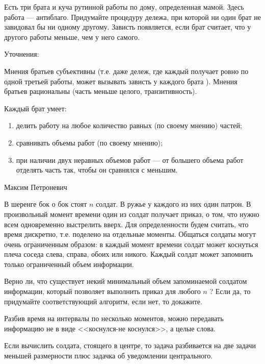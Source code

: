 \begin{problem}

Есть три брата и куча рутинной работы по дому, определенная мамой. Здесь работа --- антиблаго. Придумайте процедуру дележа, при которой ни один брат не завидовал бы ни одному другому. Зависть появляется, если брат считает, что у другого работы меньше, чем у него самого. \par
Уточнения: \par
Мнения братьев субъективны (т.е. даже дележ, где каждый получает ровно по одной третьей работы, может вызывать зависть у каждого брата ). Мнения братьев рациональны (часть меньше целого, транзитивность). \par
Каждый брат умеет:
\begin{enumerate}
\item  делить работу на любое количество равных (по своему мнению) частей;
\item сравнивать объемы работ (по своему мнению);
\item  при наличии двух неравных объемов работ --- от большего объема работ отделять часть так, чтобы он сравнялся с меньшим\cite{peterson:epefcd}.
\end{enumerate}


\begin{sol}

\end{sol}
\end{problem}



\begin{problem}
\begin{source}
Максим Петроневич
\end{source}
В шеренге бок о бок стоят  $n$  солдат. В ружье у каждого из них один патрон. В произвольный момент времени один из солдат получает приказ, о том, что нужно всем одновременно выстрелить вверх. Для определенности будем считать, что время дискретно, т.е. поделено на отдельные моменты. Общаться солдаты могут очень ограниченным образом: в каждый момент времени солдат может коснуться плеча соседа слева, справа, обоих или никого. Каждый солдат может запомнить только ограниченный объем информации.\par
Верно ли, что существует некий минимальный объем запоминаемой солдатом информации, который позволяет выполнить приказ для любого  $n$ ? Если да, то придумайте соответствующий алгоритм, если нет, то докажите.



\begin{sol}

Разбив время на интервалы по несколько моментов, можно передавать информацию не в виде <<коснулся-не коснулся>>, а целые слова.\par
Если вычислить солдата, стоящего в центре, то задача разбивается на две задачи меньшей размерности плюс задачка об уведомлении центрального.
\end{sol}
\end{problem}







